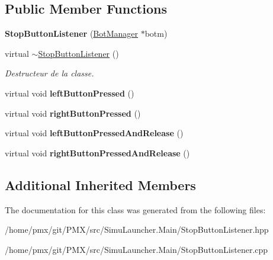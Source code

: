 \subsection*{Public Member Functions}
\begin{DoxyCompactItemize}
\item 
\mbox{\label{classStopButtonListener_a0d4568462d73ce9d15853efe06b56e28}} 
{\bfseries Stop\+Button\+Listener} (\hyperlink{classBotManager}{Bot\+Manager} $\ast$botm)
\item 
\mbox{\label{classStopButtonListener_aa50f16db969c3aa77a14ead3de14c18b}} 
virtual \hyperlink{classStopButtonListener_aa50f16db969c3aa77a14ead3de14c18b}{$\sim$\+Stop\+Button\+Listener} ()
\begin{DoxyCompactList}\small\item\em Destructeur de la classe. \end{DoxyCompactList}\item 
\mbox{\label{classStopButtonListener_ae750a3b9ce1d2dfcadd89b3225695a4c}} 
virtual void {\bfseries left\+Button\+Pressed} ()
\item 
\mbox{\label{classStopButtonListener_ad10b90af8e8320113151454c6e8d3941}} 
virtual void {\bfseries right\+Button\+Pressed} ()
\item 
\mbox{\label{classStopButtonListener_af16938c2070e45626471aa6a1dec91f9}} 
virtual void {\bfseries left\+Button\+Pressed\+And\+Release} ()
\item 
\mbox{\label{classStopButtonListener_a58f2468a2b689b7638a063590d2aa24d}} 
virtual void {\bfseries right\+Button\+Pressed\+And\+Release} ()
\end{DoxyCompactItemize}
\subsection*{Additional Inherited Members}


The documentation for this class was generated from the following files\+:\begin{DoxyCompactItemize}
\item 
/home/pmx/git/\+P\+M\+X/src/\+Simu\+Launcher.\+Main/Stop\+Button\+Listener.\+hpp\item 
/home/pmx/git/\+P\+M\+X/src/\+Simu\+Launcher.\+Main/Stop\+Button\+Listener.\+cpp\end{DoxyCompactItemize}
